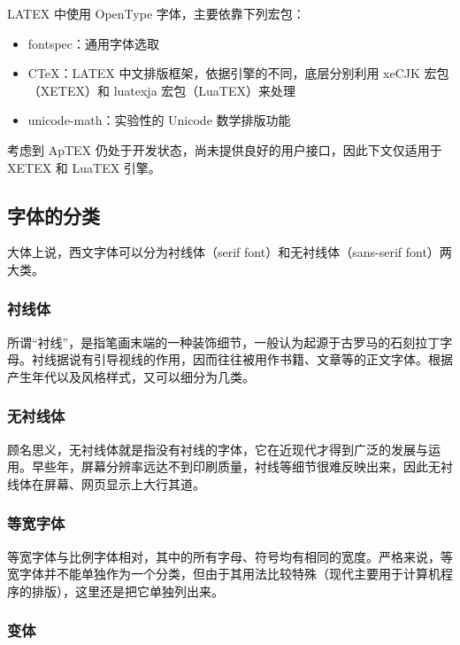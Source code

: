LATEX 中使用 OpenType 字体，主要依靠下列宏包：

\begin{itemize}
  \item fontspec：通用字体选取
  \item CTeX：LATEX 中文排版框架，依据引擎的不同，底层分别利用 xeCJK 宏包（X⁠E⁠TEX）和 luatexja 宏包（Lua­TEX）来处理
  \item unicode-math：实验性的 Unicode 数学排版功能
\end{itemize}

考虑到 Ap­TEX 仍处于开发状态，尚未提供良好的用户接口，因此下文仅适用于 X⁠E⁠TEX 和 Lua­TEX 引擎。

\subsection{字体的分类}

大体上说，西文字体可以分为衬线体（serif font）和无衬线体（sans-serif font）两大类。

\subsubsection{衬线体}

所谓“衬线”，是指笔画末端的一种装饰细节，一般认为起源于古罗马的石刻拉丁字母。衬线据说有引导视线的作用，因而往往被用作书籍、文章等的正文字体。根据产生年代以及风格样式，又可以细分为几类。

\subsubsection{无衬线体}

顾名思义，无衬线体就是指没有衬线的字体，它在近现代才得到广泛的发展与运用。早些年，屏幕分辨率远达不到印刷质量，衬线等细节很难反映出来，因此无衬线体在屏幕、网页显示上大行其道。

\subsubsection{等宽字体}

等宽字体与比例字体相对，其中的所有字母、符号均有相同的宽度。严格来说，等宽字体并不能单独作为一个分类，但由于其用法比较特殊（现代主要用于计算机程序的排版），这里还是把它单独列出来。

\subsubsection{变体}

